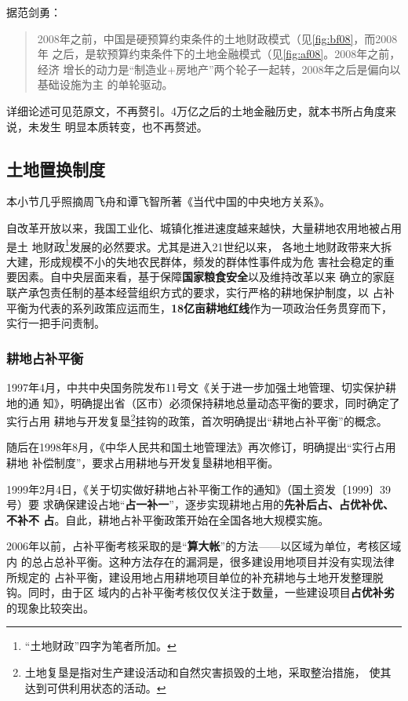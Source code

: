 据范剑勇\cite{fanjianyong}：
\begin{quotation}
  2008年之前，中国是硬预算约束条件的土地财政模式（见\cref{fig:bf08}，而2008年
  之后，是软预算约束条件下的土地金融模式（见\cref{fig:af08}。2008年之前，经济
  增长的动力是“制造业+房地产”两个轮子一起转，2008年之后是偏向以基础设施为主
  的单轮驱动。
\end{quotation}

详细论述可见范原文，不再赘引。4万亿之后的土地金融历史，就本书所占角度来说，未发生
明显本质转变，也不再赘述。

\subsection{土地置换制度}

本小节几乎照摘周飞舟和谭飞智所著《当代中国的中央地方关系》。

自改革开放以来，我国工业化、城镇化推进速度越来越快，大量耕地农用地被占用是土
地财政\footnote{“土地财政”四字为笔者所加。}发展的必然要求。尤其是进入21世纪以来，
各地土地财政带来大拆大建，形成规模不小的失地农民群体，频发的群体性事件成为危
害社会稳定的重要因素。自中央层面来看，基于保障\textbf{国家粮食安全}以及维持改革以来
确立的家庭联产承包责任制的基本经营组织方式的要求，实行严格的耕地保护制度，以
占补平衡为代表的系列政策应运而生，\textbf{18亿亩耕地红线}作为一项政治任务贯穿而下，
实行一把手问责制。

\subsubsection{耕地占补平衡}

1997年4月，中共中央国务院发布11号文《关于进一步加强土地管理、切实保护耕地的通
知》，明确提出省（区市）必须保持耕地总量动态平衡的要求，同时确定了实行占用
耕地与开发复垦\footnote{土地复垦是指对生产建设活动和自然灾害损毁的土地，采取整治措施，
  使其达到可供利用状态的活动。}挂钩的政策，首次明确提出“耕地占补平衡”的概念。

随后在1998年8月，《中华人民共和国土地管理法》再次修订，明确提出“实行占用耕地
补偿制度”，要求占用耕地与开发复垦耕地相平衡。

1999年2月4日，《关于切实做好耕地占补平衡工作的通知》（国土资发〔1999〕39号）要
求确保建设占地“\textbf{占一补一}”，逐步实现耕地占用的\textbf{先补后占、占优补优、不补不
  占}。自此，耕地占补平衡政策开始在全国各地大规模实施。

2006年以前，占补平衡考核采取的是“\textbf{算大帐}”的方法——以区域为单位，考核区域内
的总占总补平衡。这种方法存在的漏洞是，很多建设用地项目并没有实现法律所规定的
占补平衡，建设用地占用耕地项目单位的补充耕地与土地开发整理脱钩。同时，由于区
域内的占补平衡考核仅仅关注于数量，一些建设项目\textbf{占优补劣}的现象比较突出。

